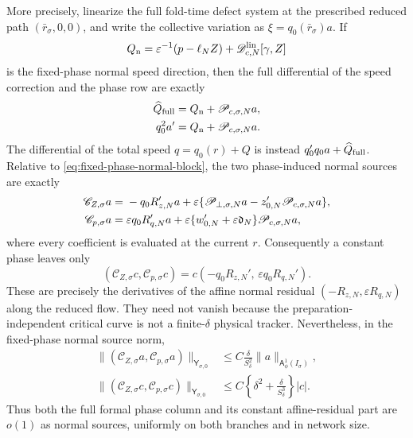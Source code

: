 \begin{lemma}
More precisely, linearize the full fold-time defect system at the prescribed
reduced path \((\bar r_\sigma,0,0)\), and write the collective variation as
\(\xi=q_0(\bar r_\sigma)a\).  If
\begin{equation}
 Q_{\rm n}
 =\varepsilon^{-1}(p-\ell_NZ)
       +\mathscr D_{c,N}^{\rm lin}[\gamma,Z]        \label{eq:phase-column-normal-speed}
\end{equation}
is the fixed-phase normal speed direction, then the full differential of the
speed correction and the phase row are exactly
\begin{align}
 \widehat Q_{\rm full}
 &=Q_{\rm n}+\mathscr P_{c,\sigma,N}a,\notag\\
 q_0^2a'
 &=Q_{\rm n}+\mathscr P_{c,\sigma,N}a.             \label{eq:full-delayed-phase-row}
\end{align}
The differential of the total speed \(q=q_0(r)+Q\) is instead
\(q_0'q_0a+\widehat Q_{\rm full}\).
Relative to \cref{eq:fixed-phase-normal-block}, the two phase-induced normal
sources are exactly
\begin{align}
 \mathscr C_{Z,\sigma}a
 ={}&-q_0R_{z,N}'a
   +\varepsilon\{\mathscr P_{\perp,\sigma,N}a
           -z_{0,N}'\mathscr P_{c,\sigma,N}a\},\notag\\
 \mathscr C_{p,\sigma}a
 ={}&\varepsilon q_0R_{q,N}'a
   +\varepsilon\{w_{0,N}'+\varepsilon\mathfrak d_N\}
             \mathscr P_{c,\sigma,N}a,             \label{eq:exact-phase-normal-source-column}
\end{align}
where every coefficient is evaluated at the current \(r\).
Consequently a constant phase leaves only
\begin{equation}
 (\mathscr C_{Z,\sigma}c,\mathscr C_{p,\sigma}c)
 =c(-q_0R_{z,N}',\,\varepsilon q_0R_{q,N}').       \label{eq:constant-phase-residual-column}
\end{equation}
These are precisely the derivatives of the affine normal residual
\((-R_{z,N},\varepsilon R_{q,N})\) along the reduced flow.  They need not
vanish because the preparation-independent critical curve is not a
finite-\(\delta\) physical tracker.
Nevertheless, in the fixed-phase normal source norm,
\begin{align}
 \|(\mathscr C_{Z,\sigma}a,\mathscr C_{p,\sigma}a)\|_{
       \mathsf Y_{\sigma,0}}
 &\le C\frac{\delta}{S_\delta^2}
       \|a\|_{\mathsf A_\phi^1(I_\sigma)},         \label{eq:phase-normal-source-bound}\\
 \|(\mathscr C_{Z,\sigma}c,\mathscr C_{p,\sigma}c)\|_{
       \mathsf Y_{\sigma,0}}
 &\le C\left\{\delta^2+\frac{\delta}{S_\delta^3}\right\}|c|.
                                                        \label{eq:constant-phase-normal-source-bound}
\end{align}
Thus both the full formal phase column and its constant affine-residual
part are \(o(1)\) as normal sources, uniformly on both branches and in
network size.


\end{lemma}
